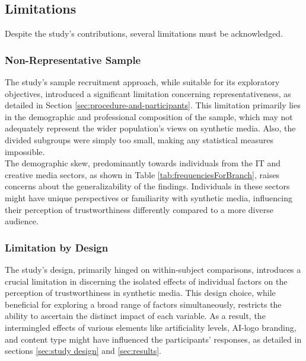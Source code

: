 \documentclass[
  a4paper,  %
  twoside,  %
  bibliography=totoc,
  headsepline,
  cleardoublepage=empty,
  parskip=half,
  draft=false
]{scrbook}
\begin{document}
\subsection{Limitations}
\label{subsec:limitations}
Despite the study's contributions, several limitations must be acknowledged.

\subsubsection{Non-Representative Sample}

The study's sample recruitment approach, while suitable for its exploratory objectives, introduced a significant limitation concerning representativeness, as detailed in Section \ref{sec:procedure-and-participants}. This limitation primarily lies in the demographic and professional composition of the sample, which may not adequately represent the wider population's views on synthetic media. Also, the divided subgroups were simply too small, making any statistical measures impossible. \\
The demographic skew, predominantly towards individuals from the IT and creative media sectors, as shown in Table \ref{tab:frequenciesForBranch}, raises concerns about the generalizability of the findings. Individuals in these sectors might have unique perspectives or familiarity with synthetic media, influencing their perception of trustworthiness differently compared to a more diverse audience.

\subsubsection{Limitation by Design}
The study's design, primarily hinged on within-subject comparisons, introduces a crucial limitation in discerning the isolated effects of individual factors on the perception of trustworthiness in synthetic media. This design choice, while beneficial for exploring a broad range of factors simultaneously, restricts the ability to ascertain the distinct impact of each variable. As a result, the intermingled effects of various elements like artificiality levels, AI-logo branding, and content type might have influenced the participants' responses, as detailed in sections \ref{sec:study design} and \ref{sec:results}.
\end{document}
